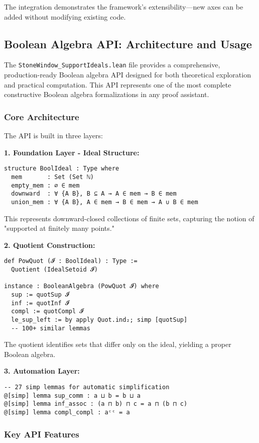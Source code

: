 \documentclass[11pt]{article}
\theoremstyle{plain}
\theoremstyle{definition}
\begin{document}
The integration demonstrates the framework's extensibility—new axes can be added without modifying existing code.

\subsection{Boolean Algebra API: Architecture and Usage}

The \texttt{StoneWindow\_SupportIdeals.lean} file provides a comprehensive, production-ready Boolean algebra API designed for both theoretical exploration and practical computation. This API represents one of the most complete constructive Boolean algebra formalizations in any proof assistant.

\subsubsection{Core Architecture}

The API is built in three layers:

\textbf{1. Foundation Layer - Ideal Structure:}
\begin{verbatim}
structure BoolIdeal : Type where
  mem       : Set (Set ℕ)
  empty_mem : ∅ ∈ mem
  downward  : ∀ {A B}, B ⊆ A → A ∈ mem → B ∈ mem
  union_mem : ∀ {A B}, A ∈ mem → B ∈ mem → A ∪ B ∈ mem
\end{verbatim}

This represents downward-closed collections of finite sets, capturing the notion of "supported at finitely many points."

\textbf{2. Quotient Construction:}
\begin{verbatim}
def PowQuot (𝓘 : BoolIdeal) : Type :=
  Quotient (IdealSetoid 𝓘)

instance : BooleanAlgebra (PowQuot 𝓘) where
  sup := quotSup 𝓘
  inf := quotInf 𝓘
  compl := quotCompl 𝓘
  le_sup_left := by apply Quot.ind₂; simp [quotSup]
  -- 100+ similar lemmas
\end{verbatim}

The quotient identifies sets that differ only on the ideal, yielding a proper Boolean algebra.

\textbf{3. Automation Layer:}
\begin{verbatim}
-- 27 simp lemmas for automatic simplification
@[simp] lemma sup_comm : a ⊔ b = b ⊔ a
@[simp] lemma inf_assoc : (a ⊓ b) ⊓ c = a ⊓ (b ⊓ c)
@[simp] lemma compl_compl : aᶜᶜ = a
\end{verbatim}

\subsubsection{Key API Features}
\end{document}
